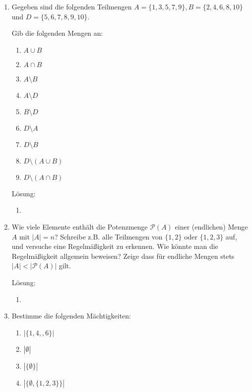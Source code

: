 \documentclass[../main.tex]{subfiles}
\begin{document}
\begin{enumerate}
	\item Gegeben sind die folgenden Teilmengen \(A = \{ 1, 3, 5, 7, 9 \}, B = \{2, 4, 6, 8, 10 \} \) und
	      \(D = \{ 5,6,7,8,9,10\} \).

	      Gib die folgenden Mengen an:
	      \begin{enumerate}
		      \item \(A \cup B \)
		      \item \(A \cap B \)
		      \item \(A \setminus B \)
		      \item \(A \setminus D \)
		      \item \(B \setminus D \)
		      \item \(D \setminus A \)
		      \item \(D \setminus B \)
		      \item \(D \setminus(A \cup B) \)
		      \item \(D \setminus(A \cap B) \)
	      \end{enumerate}

	      Lösung:
	      \begin{enumerate}
		      \item
	      \end{enumerate}
	\item Wie viele Elemente enthält die Potenzmenge \( \mathcal{P}(A) \) einer (endlichen)
	      Menge \(A \) mit \( |A| = n \)? Schreibe z.B. alle Teilmengen von \( \{1,2\} \) oder
	      \( \{1,2,3\} \) auf, und versuche eine Regelmäßigkeit zu erkennen.
	      Wie könnte man die Regelmäßigkeit allgemein beweisen?
	      Zeige dass für endliche Mengen stets \( |A| < |\mathcal{P}(A)| \) gilt.

	      Lösung:
	      \begin{enumerate}
		      \item
	      \end{enumerate}
	\item Bestimme die folgenden Mächtigkeiten:
	      \begin{enumerate}
		      \item \( |\{1, 4, ,6 \}| \)
		      \item \( |\emptyset| \)
		      \item \( |\{ \emptyset \}| \)
		      \item \( |\{ \emptyset, \{ 1, 2 ,3 \} \}| \)
	      \end{enumerate}


\end{enumerate}
\end{document}
